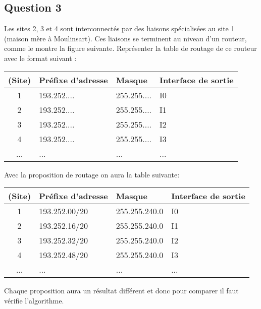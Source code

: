 \documentclass{article}
\begin{document}
\subsection*{Question 3}
\begin{exercise}
    Les sites 2, 3 et 4 sont interconnectés par des liaisons spécialisées au site 1 (maison mère à Moulinsart). Ces liaisons se terminent au niveau d'un routeur, comme le montre la figure suivante. Représenter la table de routage de ce routeur avec le format suivant :
    \begin{table}[H]
        \centering\begin{tabular}{clll}
            (Site) & Préfixe d'adresse & Masque & Interface de sortie\\
            \hline
            1 & 193.252.... & 255.255.... & I0\\
            2 & 193.252.... & 255.255.... & I1\\
            3 & 193.252.... & 255.255.... & I2\\
            4 & 193.252.... & 255.255.... & I3\\
            ... & ... & ... & ...\\
            \hline
        \end{tabular}
    \end{table}
\end{exercise}
\begin{resolution}
    Avec la proposition de routage on aura la table suivante:
    \begin{table}[H]
        \centering\begin{tabular}{clll}
            (Site) & Préfixe d'adresse & Masque & Interface de sortie\\
            \hline
            1 & 193.252.00/20 & 255.255.240.0 & I0\\
            2 & 193.252.16/20 & 255.255.240.0 & I1\\
            3 & 193.252.32/20 & 255.255.240.0 & I2\\
            4 & 193.252.48/20 & 255.255.240.0 & I3\\
            ... & ... & ... & ...\\
            \hline
        \end{tabular}
    \end{table}
    \begin{remark}
        Chaque proposition aura un résultat différent et donc pour comparer il faut vérifie l'algorithme.
    \end{remark}
\end{resolution}
\end{document}
